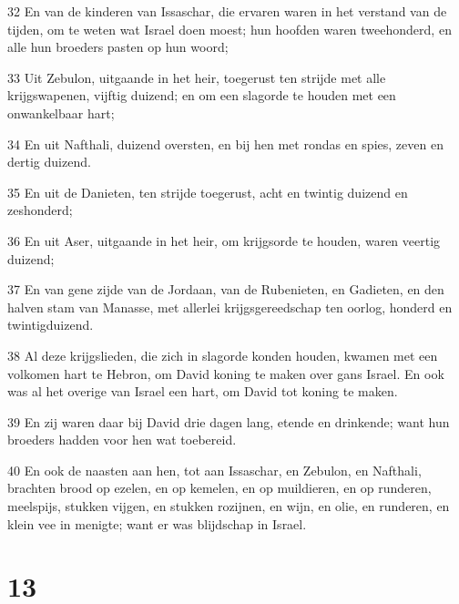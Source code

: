 \par 32 En van de kinderen van Issaschar, die ervaren waren in het verstand van de tijden, om te weten wat Israel doen moest; hun hoofden waren tweehonderd, en alle hun broeders pasten op hun woord;
\par 33 Uit Zebulon, uitgaande in het heir, toegerust ten strijde met alle krijgswapenen, vijftig duizend; en om een slagorde te houden met een onwankelbaar hart;
\par 34 En uit Nafthali, duizend oversten, en bij hen met rondas en spies, zeven en dertig duizend.
\par 35 En uit de Danieten, ten strijde toegerust, acht en twintig duizend en zeshonderd;
\par 36 En uit Aser, uitgaande in het heir, om krijgsorde te houden, waren veertig duizend;
\par 37 En van gene zijde van de Jordaan, van de Rubenieten, en Gadieten, en den halven stam van Manasse, met allerlei krijgsgereedschap ten oorlog, honderd en twintigduizend.
\par 38 Al deze krijgslieden, die zich in slagorde konden houden, kwamen met een volkomen hart te Hebron, om David koning te maken over gans Israel. En ook was al het overige van Israel een hart, om David tot koning te maken.
\par 39 En zij waren daar bij David drie dagen lang, etende en drinkende; want hun broeders hadden voor hen wat toebereid.
\par 40 En ook de naasten aan hen, tot aan Issaschar, en Zebulon, en Nafthali, brachten brood op ezelen, en op kemelen, en op muildieren, en op runderen, meelspijs, stukken vijgen, en stukken rozijnen, en wijn, en olie, en runderen, en klein vee in menigte; want er was blijdschap in Israel.

\chapter{13}

